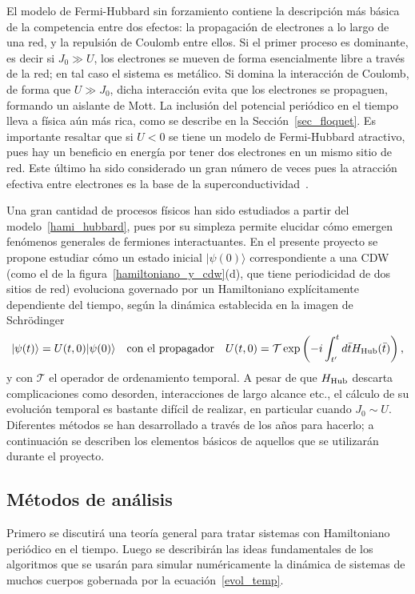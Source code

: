\documentclass[a4paper,10pt]{article}
\begin{document}
El modelo de Fermi-Hubbard sin forzamiento contiene la descripci\'on m\'as b\'asica de la competencia entre dos efectos: la propagaci\'on de electrones a lo largo de una red, y la repulsi\'on de Coulomb entre ellos. Si el primer proceso es dominante, es decir si $J_0\gg U$, los electrones se mueven de forma esencialmente libre a trav\'es de la red; en tal caso el sistema es met\'alico. Si domina la interacci\'on de Coulomb, de forma que $U\gg J_0$, dicha interacci\'on evita que los electrones se propaguen, formando un aislante de Mott. La inclusi\'on del potencial peri\'odico en el tiempo lleva a f\'isica a\'un m\'as rica, como se describe en la Secci\'on~\ref{sec_floquet}. Es importante resaltar que si $U<0$ se tiene un modelo de Fermi-Hubbard atractivo, pues hay un beneficio en energ\'ia por tener dos electrones en un mismo sitio de red. Este \'ultimo ha sido considerado un gran n\'umero de veces pues la atracci\'on efectiva entre electrones es la base de la superconductividad~\cite{tinkham}.  

Una gran cantidad de procesos f\'isicos han sido estudiados a partir del modelo~\eqref{hami_hubbard}, pues por su simpleza permite elucidar c\'omo emergen fen\'omenos generales de fermiones interactuantes. En el presente proyecto se propone estudiar c\'omo un estado inicial $|\psi(0)\rangle$ correspondiente a una CDW (como el de la figura~\ref{hamiltoniano_y_cdw}(d), que tiene periodicidad de dos sitios de red) evoluciona governado por un Hamiltoniano expl\'icitamente dependiente del tiempo, seg\'un la din\'amica establecida en la imagen de Schr\"odinger
\begin{equation} \label{evol_temp}
|\psi(t)\rangle=U(t,0)|\psi(0)\rangle\quad\text{con el propagador}\quad U(t,0)=\mathcal{T}\exp\left(-i\int_{t'}^{t}d\bar{t}H_{\rm Hub}(\bar{t})\right),
\end{equation}
y con $\mathcal{T}$ el operador de ordenamiento temporal. A pesar de que $H_{\rm Hub}$ descarta complicaciones como desorden, interacciones de largo alcance etc., el c\'alculo de su evoluci\'on temporal es bastante dif\'icil de realizar, en particular cuando $J_0\sim U$. Diferentes m\'etodos se han desarrollado a trav\'es de los a\~nos para hacerlo; a continuaci\'on se describen los elementos b\'asicos de aquellos que se utilizar\'an durante el proyecto.

\subsection{M\'etodos de an\'alisis}
Primero se discutir\'a una teor\'ia general para tratar sistemas con Hamiltoniano peri\'odico en el tiempo. Luego se describir\'an las ideas fundamentales de los algoritmos que se usar\'an para simular num\'ericamente la din\'amica de sistemas de muchos cuerpos gobernada por la ecuaci\'on~\eqref{evol_temp}. 
\end{document}
